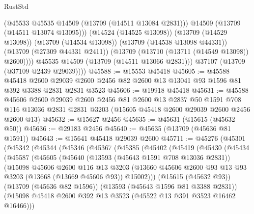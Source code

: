 \begin{lexlean}{RustStd}
\begin{coremodule}
                (@45533 @45535 @14509 (@13709 (@14511 @13084 @2831)))
                @14509
                (@13709 (@14511 @13074 @13095)))
              (@14524 (@14525 @13098))
              (@13709 (@14529 @13098))
              (@13709 (@14534 @13098))
              (@13709 (@14538 @13098 @44331))
              (@13709 (@27309 @44331 @2411))
              (@13709 (@13710 (@13711 (@14549 @13098)) @2600))))
          @45535
          @14509
          (@13709 (@14511 @13066 @2831)))
        @37107
        (@13709 (@37109 @2439 @29039))))
@45588 := @15553 @45418
@45605 := @45588
    @45418
    @2600
    @29039
    @2600
    @2456
    @82
    @2600
    @13
    @13041
    @93
    @1596
    @81
    @392
    @3388
    @2831
    @2831
    @3523
@45606 := @19918 @45418
@45631 := @45588
    @45606
    @2600
    @29039
    @2600
    @2456
    @81
    @2600
    @13
    @2837
    @50
    @1591
    @708
    @116
    @13036
    @2831
    @2831
    @3203
    (@15605 @45418 @2600 @29039 @2600 @2456 @2600 @13)
@45632 := @15627 @2456
@45635 := @45631 (@15615 (@45632 @50))
@45636 := @29183 @2456
@45640 := @45635 (@13709 (@45636 @81 @1591))
@45643 := @15641 @45418 @29039 @2600
@45711 := @45276
    (@45301
      (@45342
        (@45344
          (@45346
            (@45367
              (@45385
                (@45402
                  (@45419
                    (@45430
                      (@45434
                        (@45587
                          (@45605
                            (@45640
                              (@13593 (@45643 @1591 @708 @13036 @2831))
                              (@15098
                                @45606
                                @2600
                                @116
                                @13
                                @3203
                                (@13660
                                  @45606
                                  @2600
                                  @93
                                  @13
                                  @93
                                  @3203
                                  (@13668 (@13669 @45606 @93))
                                  @15002)))
                            (@15615 (@45632 @93))
                            (@13709 (@45636 @82 @1596))
                            (@13593 (@45643 @1596 @81 @3388 @2831))
                            (@15098
                              @45418
                              @2600
                              @392
                              @13
                              @3523
                              (@45522 @13 @391 @3523 @16462 @16466)))

\end{coremodule}
\end{lexlean}
